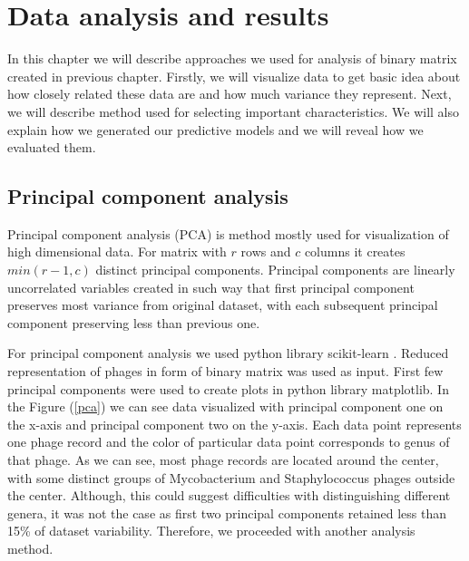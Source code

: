\chapter{Data analysis and results}
In this chapter we will describe approaches we used for analysis of binary matrix created in previous chapter. 
Firstly, we will visualize data to get basic idea about how closely related these data are and how much variance they represent.
Next, we will describe method used for selecting important characteristics.
We will also explain how we generated our predictive models and we will reveal how we evaluated them.

\section{Principal component analysis}
Principal component analysis (PCA) is method mostly used for visualization of high dimensional data.
For matrix with $r$ rows and $c$ columns it creates $min(r-1, c)$ distinct principal components.
Principal components are linearly uncorrelated variables created in such way that first principal component preserves most variance from original dataset, with each subsequent principal component preserving less than previous one.

For principal component analysis we used python library scikit-learn \cite{sklearn}.
Reduced representation of phages in form of binary matrix was used as input.
First few principal components were used to create plots in python library matplotlib.
In the Figure (\ref{pca}) we can see data visualized with principal component one on the x-axis and principal component two on the y-axis.
Each data point represents one phage record and the color of particular data point corresponds to genus of that phage.
As we can see, most phage records are located around the center, with some distinct groups of Mycobacterium and Staphylococcus phages outside the center.
Although, this could suggest difficulties with distinguishing different genera, it was not the case as first two principal components retained less than 15\% of dataset variability.
Therefore, we proceeded with another analysis method.

